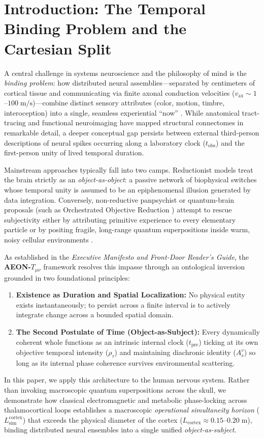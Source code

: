 \documentclass[11pt,a4paper]{article}
\begin{document}
\section{Introduction: The Temporal Binding Problem and the Cartesian Split}
A central challenge in systems neuroscience and the philosophy of mind is the \emph{binding problem}: how distributed neural assemblies—separated by centimeters of cortical tissue and communicating via finite axonal conduction velocities ($v_{\mathrm{ax}} \sim 1$--$100\;\mathrm{m/s}$)—combine distinct sensory attributes (color, motion, timbre, interoception) into a single, seamless experiential ``now'' \cite{treisman1996,singer1999,varela2001}. While anatomical tract-tracing and functional neuroimaging have mapped structural connectomes in remarkable detail, a deeper conceptual gap persists between external third-person descriptions of neural spikes occurring along a laboratory clock ($t_{\mathrm{obs}}$) and the first-person unity of lived temporal duration.

Mainstream approaches typically fall into two camps. Reductionist models treat the brain strictly as an \emph{object-as-object}: a passive network of biophysical switches whose temporal unity is assumed to be an epiphenomenal illusion generated by data integration. Conversely, non-reductive panpsychist or quantum-brain proposals (such as Orchestrated Objective Reduction \cite{hameroff2014}) attempt to rescue subjectivity either by attributing primitive experience to every elementary particle or by positing fragile, long-range quantum superpositions inside warm, noisy cellular environments \cite{tegmark2000}.

As established in the \emph{Executive Manifesto and Front-Door Reader's Guide}, the \textbf{AEON-$T_{\mu\nu}$} framework resolves this impasse through an ontological inversion grounded in two foundational principles:
\begin{enumerate}
    \item \textbf{Existence as Duration and Spatial Localization:} No physical entity exists instantaneously; to persist across a finite interval is to actively integrate change across a bounded spatial domain.
    \item \textbf{The Second Postulate of Time (Object-as-Subject):} Every dynamically coherent whole functions as an intrinsic internal clock ($t_{\mathrm{pre}}$) ticking at its own objective temporal intensity ($\rho_\tau$) and maintaining diachronic identity ($A_s^v$) so long as its internal phase coherence survives environmental scattering.
\end{enumerate}
In this paper, we apply this architecture to the human nervous system. Rather than invoking macroscopic quantum superpositions across the skull, we demonstrate how classical electromagnetic and metabolic phase-locking across thalamocortical loops establishes a macroscopic \emph{operational simultaneity horizon} ($L_{\mathrm{sim}}^{\mathrm{cortex}}$) that exceeds the physical diameter of the cortex ($L_{\mathrm{cortex}} \approx 0.15$--$0.20\;\mathrm{m}$), binding distributed neural ensembles into a single unified \emph{object-as-subject}.
\end{document}
